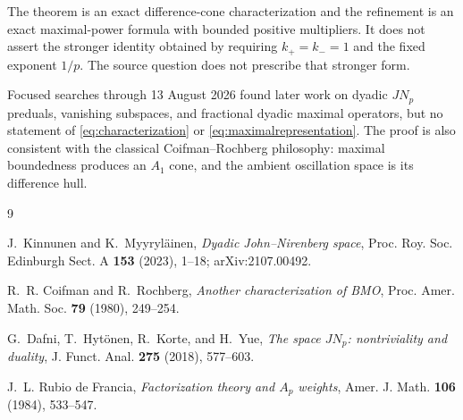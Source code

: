 \documentclass[11pt]{article}
\begin{document}
The theorem is an exact difference-cone characterization and the refinement
is an exact maximal-power formula with bounded positive multipliers.  It does
not assert the stronger identity obtained by requiring $k_+=k_-=1$ and the
fixed exponent $1/p$.  The source question does not prescribe that stronger
form.

Focused searches through 13 August 2026 found later work on dyadic $JN_p$
preduals, vanishing subspaces, and fractional dyadic maximal operators, but no
statement of \eqref{eq:characterization} or \eqref{eq:maximalrepresentation}.
The proof is also consistent with the classical Coifman--Rochberg philosophy:
maximal boundedness produces an $A_1$ cone, and the ambient oscillation space
is its difference hull.

\begin{thebibliography}{9}

J.~Kinnunen and K.~Myyryl\"ainen,
\emph{Dyadic John--Nirenberg space},
Proc. Roy. Soc. Edinburgh Sect. A \textbf{153} (2023), 1--18;
arXiv:2107.00492.

R.~R. Coifman and R.~Rochberg,
\emph{Another characterization of BMO},
Proc. Amer. Math. Soc. \textbf{79} (1980), 249--254.

G.~Dafni, T.~Hyt\"onen, R.~Korte, and H.~Yue,
\emph{The space $JN_p$: nontriviality and duality},
J. Funct. Anal. \textbf{275} (2018), 577--603.

J.~L. Rubio de Francia,
\emph{Factorization theory and $A_p$ weights},
Amer. J. Math. \textbf{106} (1984), 533--547.

\end{thebibliography}
\end{document}
